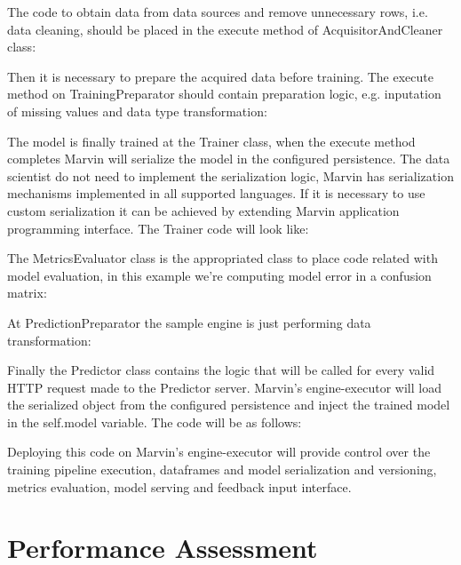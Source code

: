 \documentclass[twoside,11pt]{article}
\begin{document}
The code to obtain data from data sources and remove unnecessary rows, i.e. data cleaning, should be placed in the execute method of AcquisitorAndCleaner class:


Then it is necessary to prepare the acquired data before training. The execute method on TrainingPreparator should contain preparation logic, e.g. inputation of missing values and data type transformation:



The model is finally trained at the Trainer class, when the execute method completes Marvin will serialize the model in the configured persistence. The data scientist do not need to implement the serialization logic, Marvin has serialization mechanisms implemented in all supported languages. If it is necessary to use custom serialization it can be achieved by extending Marvin application programming interface. The Trainer code will look like:



The MetricsEvaluator class is the appropriated class to place code related with model evaluation, in this example we're computing model error in a confusion matrix:



At PredictionPreparator the sample engine is just performing data transformation:


Finally the Predictor class contains the logic that will be called for every valid HTTP request made to the Predictor server. Marvin's engine-executor will load the serialized object from the configured persistence and inject the trained model in the self.model variable. The code will be as follows:


Deploying this code on Marvin's engine-executor will provide control over the training pipeline execution, dataframes and model serialization and versioning, metrics evaluation, model serving and feedback input interface.

\section{Performance Assessment}
\end{document}
